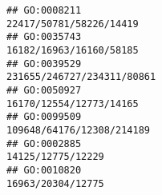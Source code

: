 \documentclass[
]{article}
\begin{document}
\begin{verbatim}
## GO:0008211                                                                                                                                                                                                                                                                                                                                                                                      22417/50781/58226/14419
## GO:0035743                                                                                                                                                                                                                                                                                                                                                                                      16182/16963/16160/58185
## GO:0039529                                                                                                                                                                                                                                                                                                                                                                                   231655/246727/234311/80861
## GO:0050927                                                                                                                                                                                                                                                                                                                                                                                      16170/12554/12773/14165
## GO:0099509                                                                                                                                                                                                                                                                                                                                                                                    109648/64176/12308/214189
## GO:0002885                                                                                                                                                                                                                                                                                                                                                                                            14125/12775/12229
## GO:0010820                                                                                                                                                                                                                                                                                                                                                                                            16963/20304/12775

\end{verbatim}
\end{document}
